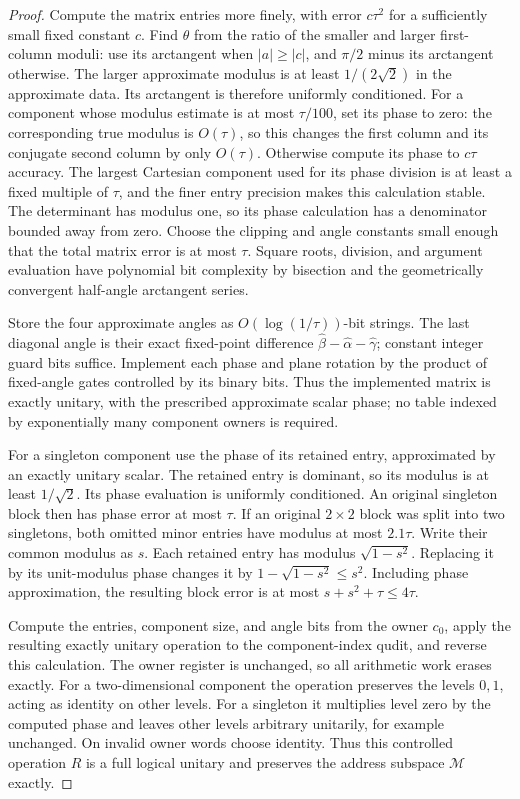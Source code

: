 \documentclass[11pt]{article}
\begin{document}
\begin{proof}
Compute the matrix entries more finely, with error
$c\tau^2$ for a sufficiently small fixed constant $c$.
Find $\theta$ from the ratio of the smaller and larger
first-column moduli: use its arctangent when $|a|\ge|c|$,
and $\pi/2$ minus its arctangent otherwise.
The larger approximate modulus is at least
$1/(2\sqrt2)$ in the approximate data.
Its arctangent is therefore uniformly conditioned.
For a component whose modulus estimate is at most
$\tau/100$, set its phase to zero: the corresponding
true modulus is $O(\tau)$, so this changes the
first column and its conjugate second column by
only $O(\tau)$. Otherwise compute its phase to
$c\tau$ accuracy. The largest Cartesian component
used for its phase division is at least a fixed
multiple of $\tau$, and the finer entry precision
makes this calculation stable.
The determinant has modulus one, so its phase
calculation has a denominator bounded away from zero.
Choose the clipping and angle constants small enough
that the total matrix error is at most $\tau$.
Square roots, division, and argument evaluation have
polynomial bit complexity by bisection and the
geometrically convergent half-angle arctangent series.

Store the four approximate angles as
$O(\log(1/\tau))$-bit strings. The last diagonal angle
is their exact fixed-point difference
$\widehat\beta-\widehat\alpha-\widehat\gamma$;
constant integer guard bits suffice.
Implement each phase and plane rotation by the
product of fixed-angle gates controlled by its
binary bits. Thus the implemented matrix is exactly
unitary, with the prescribed approximate scalar phase;
no table indexed by exponentially many component
owners is required.

For a singleton component use the phase of its retained
entry, approximated by an exactly unitary scalar.
The retained entry is dominant, so its modulus is
at least $1/\sqrt2$. Its phase evaluation is uniformly
conditioned.
An original singleton block then has phase error
at most $\tau$.
If an original $2\times2$ block was split into two
singletons, both omitted minor entries have modulus
at most $2.1\tau$. Write their common modulus as $s$.
Each retained entry has modulus $\sqrt{1-s^2}$.
Replacing it by its unit-modulus phase changes it by
$1-\sqrt{1-s^2}\le s^2$.
Including phase approximation, the resulting block
error is at most
$s+s^2+\tau\le4\tau$.

Compute the entries, component size, and angle bits
from the owner $c_0$, apply the resulting exactly
unitary operation to the component-index qudit, and
reverse this calculation. The owner register is
unchanged, so all arithmetic work erases exactly.
For a two-dimensional component the operation preserves
the levels $0,1$, acting as identity on other levels.
For a singleton it multiplies level zero by the
computed phase and leaves other levels arbitrary
unitarily, for example unchanged.
On invalid owner words choose identity.
Thus this controlled operation $R$ is a full logical
unitary and preserves the address subspace
$\mathcal M$ exactly.


\end{proof}
\end{document}
